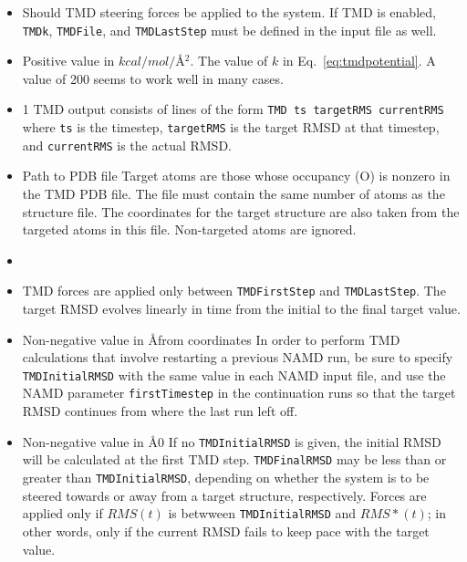\begin{itemize}
\item
{}
{Should TMD steering forces be applied to the system.  If TMD is enabled,
{\tt TMDk}, {\tt TMDFile}, and {\tt TMDLastStep} must be defined in the 
input file as well.}

\item
{}
{Positive value in $kcal/mol/$\AA$^2$.}
{The value of $k$ in Eq.~\ref{eq:tmdpotential}.  A value of 200 seems to work
well in many cases.}

\item
{}
{1} 
{ TMD output consists of lines of the form {\tt TMD  ts  targetRMS  currentRMS}
where {\tt ts} is the timestep, {\tt targetRMS} is the target RMSD at that 
timestep, and {\tt currentRMS} is the actual RMSD.}

\item
{}
{Path to PDB file}
{
Target atoms are those whose occupancy (O) is nonzero in the TMD PDB file.
The file must contain the same number of atoms as the structure file.  The
coordinates for the target structure are also taken from the targeted
atoms in this file.  Non-targeted atoms are ignored.
}

\item
{} {}
\item
{}
{ TMD forces are applied only between {\tt TMDFirstStep} and {\tt TMDLastStep}.
The target RMSD evolves linearly in time from the initial to the final target 
value.  }

\item
{}
{Non-negative value in \AA}{from coordinates}{
In order to perform TMD calculations that involve restarting a previous
NAMD run, be sure to specify {\tt TMDInitialRMSD} with the same value
in each NAMD input file, and use the NAMD parameter {\tt firstTimestep}
in the continuation runs so that the target RMSD continues from where the
last run left off.
}
\item
{}
{Non-negative value in \AA}{0}
{If no {\tt TMDInitialRMSD} is given, the initial RMSD will be calculated at the
first TMD step.  {\tt TMDFinalRMSD} may be less than or greater than
{\tt TMDInitialRMSD}, depending on whether the system is to be steered 
towards or away from a target structure, respectively.  Forces are applied
only if $RMS(t)$ is betwween {\tt TMDInitialRMSD} and $RMS*(t)$; in other
words, only if the current RMSD fails to keep pace with the target value.}
\end{itemize}

